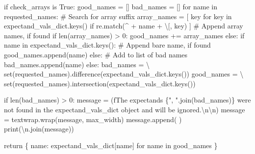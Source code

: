 \documentclass[
  letterpaper,
  DIV=11,
  numbers=noendperiod]{scrartcl}
\newenvironment{Shaded}{\begin{snugshade}}{\end{snugshade}}
\newcommand{\BuiltInTok}[1]{\textcolor[rgb]{0.00,0.23,0.31}{#1}}
\newcommand{\CharTok}[1]{\textcolor[rgb]{0.13,0.47,0.30}{#1}}
\newcommand{\CommentTok}[1]{\textcolor[rgb]{0.37,0.37,0.37}{#1}}
\newcommand{\ControlFlowTok}[1]{\textcolor[rgb]{0.00,0.23,0.31}{#1}}
\newcommand{\DecValTok}[1]{\textcolor[rgb]{0.68,0.00,0.00}{#1}}
\newcommand{\KeywordTok}[1]{\textcolor[rgb]{0.00,0.23,0.31}{#1}}
\newcommand{\NormalTok}[1]{\textcolor[rgb]{0.00,0.23,0.31}{#1}}
\newcommand{\OperatorTok}[1]{\textcolor[rgb]{0.37,0.37,0.37}{#1}}
\newcommand{\SpecialCharTok}[1]{\textcolor[rgb]{0.37,0.37,0.37}{#1}}
\newcommand{\SpecialStringTok}[1]{\textcolor[rgb]{0.13,0.47,0.30}{#1}}
\newcommand{\StringTok}[1]{\textcolor[rgb]{0.13,0.47,0.30}{#1}}
\newcommand{\VariableTok}[1]{\textcolor[rgb]{0.07,0.07,0.07}{#1}}
\begin{document}
\begin{Shaded}
\begin{Highlighting}[]
  \ControlFlowTok{if}\NormalTok{ check\_arrays }\KeywordTok{is} \VariableTok{True}\NormalTok{:}
\NormalTok{    good\_names }\OperatorTok{=}\NormalTok{ []}
\NormalTok{    bad\_names }\OperatorTok{=}\NormalTok{ []}
    \ControlFlowTok{for}\NormalTok{ name }\KeywordTok{in}\NormalTok{ requested\_names:}
      \CommentTok{\# Search for array suffix}
\NormalTok{      array\_names }\OperatorTok{=}\NormalTok{ [ key }\ControlFlowTok{for}\NormalTok{ key }\KeywordTok{in}\NormalTok{ expectand\_vals\_dict.keys()}
                      \ControlFlowTok{if}\NormalTok{ re.match(}\StringTok{\textquotesingle{}\^{}\textquotesingle{}} \OperatorTok{+}\NormalTok{ name }\OperatorTok{+} \StringTok{\textquotesingle{}\textbackslash{}[\textquotesingle{}}\NormalTok{, key) ]}
      \CommentTok{\# Append array names, if found}
      \ControlFlowTok{if} \BuiltInTok{len}\NormalTok{(array\_names) }\OperatorTok{\textgreater{}} \DecValTok{0}\NormalTok{:}
\NormalTok{        good\_names }\OperatorTok{+=}\NormalTok{ array\_names}
      \ControlFlowTok{else}\NormalTok{:}
        \ControlFlowTok{if}\NormalTok{ name }\KeywordTok{in}\NormalTok{ expectand\_vals\_dict.keys():}
          \CommentTok{\# Append bare name, if found}
\NormalTok{          good\_names.append(name)}
        \ControlFlowTok{else}\NormalTok{:}
          \CommentTok{\# Add to list of bad names}
\NormalTok{          bad\_names.append(name)}
  \ControlFlowTok{else}\NormalTok{:}
\NormalTok{    bad\_names }\OperatorTok{=} \OperatorTok{\textbackslash{}}
      \BuiltInTok{set}\NormalTok{(requested\_names).difference(expectand\_vals\_dict.keys())}
\NormalTok{    good\_names }\OperatorTok{=} \OperatorTok{\textbackslash{}}
      \BuiltInTok{set}\NormalTok{(requested\_names).intersection(expectand\_vals\_dict.keys())}

  \ControlFlowTok{if} \BuiltInTok{len}\NormalTok{(bad\_names) }\OperatorTok{\textgreater{}} \DecValTok{0}\NormalTok{:}
\NormalTok{    message }\OperatorTok{=}\NormalTok{ (}\SpecialStringTok{f\textquotesingle{}The expectands }\SpecialCharTok{\{}\StringTok{", "}\SpecialCharTok{.}\NormalTok{join(bad\_names)}\SpecialCharTok{\}}\SpecialStringTok{ \textquotesingle{}}
               \StringTok{\textquotesingle{}were not found in the \textasciigrave{}expectand\_vals\_dict\textasciigrave{} \textquotesingle{}}
               \StringTok{\textquotesingle{}object and will be ignored.}\CharTok{\textbackslash{}n\textbackslash{}n}\StringTok{\textquotesingle{}}\NormalTok{)}
\NormalTok{    message }\OperatorTok{=}\NormalTok{ textwrap.wrap(message, max\_width)}
\NormalTok{    message.append(}\StringTok{\textquotesingle{} \textquotesingle{}}\NormalTok{)}
    \BuiltInTok{print}\NormalTok{(}\StringTok{\textquotesingle{}}\CharTok{\textbackslash{}n}\StringTok{\textquotesingle{}}\NormalTok{.join(message))}

  \ControlFlowTok{return}\NormalTok{ \{ name: expectand\_vals\_dict[name] }\ControlFlowTok{for}\NormalTok{ name }\KeywordTok{in}\NormalTok{ good\_names \}}
\end{Highlighting}
\end{Shaded}
\end{document}
